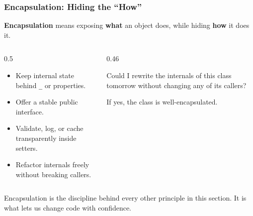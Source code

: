 \documentclass[aspectratio=169,10pt]{beamer}
\newcommand{\keyword}[1]{\textcolor{PrimaryBlue}{\textbf{#1}}}
\newenvironment{bluebox}[1]{%
  \vspace{0.08cm}\begin{tcolorbox}[lecturebox,title={#1},fontupper=\small]%
}{\end{tcolorbox}\vspace{0.05cm}}
\begin{document}
\begin{frame}[fragile]
\frametitle{Encapsulation: Hiding the ``How''}
\small
\keyword{Encapsulation} means exposing \keyword{what} an object does, while hiding \keyword{how} it does it.

\vspace{0.18cm}
\begin{columns}[T,totalwidth=0.96\textwidth]
\begin{column}{0.5\textwidth}
\begin{itemize}\setlength\itemsep{0.06cm}
  \item Keep internal state behind \texttt{\_} or properties.
  \item Offer a stable public interface.
  \item Validate, log, or cache transparently inside setters.
  \item Refactor internals freely without breaking callers.
\end{itemize}
\end{column}
\begin{column}{0.46\textwidth}
\begin{tcolorbox}[lecturebox,title=Self-test]
Could I rewrite the internals of this class tomorrow without changing any of its callers?

\vspace{0.05cm}
If yes, the class is well-encapsulated.
\end{tcolorbox}
\end{column}
\end{columns}

\vspace{0.1cm}
\begin{bluebox}{Key idea}
Encapsulation is the discipline behind every other principle in this section. It is what lets us change code with confidence.
\end{bluebox}
\end{frame}
\end{document}
